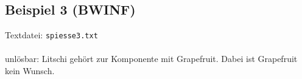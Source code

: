 \subsection{Beispiel 3 (BWINF)}\label{example:3}
Textdatei: \texttt{spiesse3.txt}\\

\noindent
{}\\

unlösbar: Litschi gehört zur Komponente mit Grapefruit. Dabei ist Grapefruit kein Wunsch.
